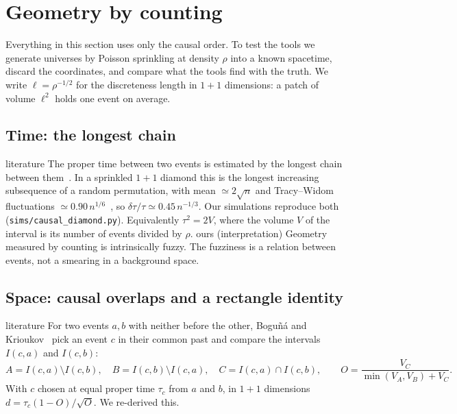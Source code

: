 \documentclass[11pt,a4paper]{article}
\newcommand{\tagbox}[2]{\textsf{\scriptsize\colorbox{#1!12}{\textcolor{#1!70!black}{#2}}}}
\newcommand{\lit}{\tagbox{blue}{literature}}
\newcommand{\ours}{\tagbox{orange}{ours}}
\begin{document}
\section{Geometry by counting}\label{sec:toolkit}
Everything in this section uses only the causal order. To test the tools we generate universes by Poisson sprinkling at density $\rho$ into a known spacetime, discard the coordinates, and compare what the tools find with the truth. We write $\ell=\rho^{-1/2}$ for the discreteness length in $1+1$ dimensions: a patch of volume $\ell^2$ holds one event on average.

\subsection{Time: the longest chain}
\lit{} The proper time between two events is estimated by the longest chain between them~\cite{BrightwellGregory91}. In a sprinkled $1+1$ diamond this is the longest increasing subsequence of a random permutation, with mean $\simeq2\sqrt n$ and Tracy--Widom fluctuations $\simeq0.90\,n^{1/6}$~\cite{BDJ99}, so $\delta\tau/\tau\simeq0.45\,n^{-1/3}$. Our simulations reproduce both (\texttt{sims/causal\_diamond.py}). Equivalently $\tau^2=2V$, where the volume $V$ of the interval is its number of events divided by $\rho$. \ours{} (interpretation) Geometry measured by counting is intrinsically fuzzy. The fuzziness is a relation between events, not a smearing in a background space.

\subsection{Space: causal overlaps and a rectangle identity}
\lit{} For two events $a,b$ with neither before the other, Boguñá and Krioukov~\cite{BK24} pick an event $c$ in their common past and compare the intervals $I(c,a)$ and $I(c,b)$:
\begin{equation}
A=I(c,a)\setminus I(c,b),\quad B=I(c,b)\setminus I(c,a),\quad C=I(c,a)\cap I(c,b),\qquad O=\frac{V_C}{\min(V_A,V_B)+V_C}.
\end{equation}
With $c$ chosen at equal proper time $\tau_c$ from $a$ and $b$, in $1+1$ dimensions $d=\tau_c(1-O)/\sqrt O$. We re-derived this.
\end{document}
